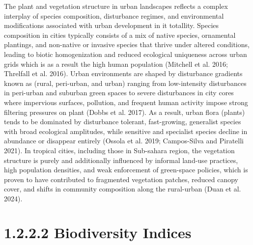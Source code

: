 The plant and vegetation structure in urban landscapes reflects a complex interplay of species composition, disturbance regimes, and environmental modifications associated with urban development in it totallity. Species composition in cities typically consists of a mix of native species, ornamental plantings, and non-native or invasive species that thrive under altered conditions, leading to biotic homogenization and reduced ecological uniqueness across urban grids which is as a result the high human population (Mitchell et al. 2016; Threlfall et al. 2016). Urban environments are shaped by disturbance gradients known as (rural, peri-urban, and urban) ranging from low-intensity disturbances in peri-urban and suburban green spaces to severe disturbances in city cores where impervious surfaces, pollution, and frequent human activity impose strong filtering pressures on plant (Dobbs et al. 2017). As a result, urban flora (plants) tends to be dominated by disturbance tolerant, fast-growing, generalist species with broad ecological amplitudes, while sensitive and specialist species decline in abundance or disappear entirely (Ossola et al. 2019; Campos-Silva and Piratelli 2021). In tropical cities, including those in Sub-sahara region, the vegetation structure is purely and additionally influenced by informal land-use practices, high population densities, and weak enforcement of green-space policies, which is proven to have contributed to fragmented vegetation patches, reduced canopy cover, and shifts in community composition along the rural-urban (Duan et al. 2024).
\hypertarget{biodiversity-indices}{%
\section{\texorpdfstring{\textbf{1.2.2.2 Biodiversity Indices}}{1.2.2.2 Biodiversity Indices}}\label{biodiversity-indices}}

